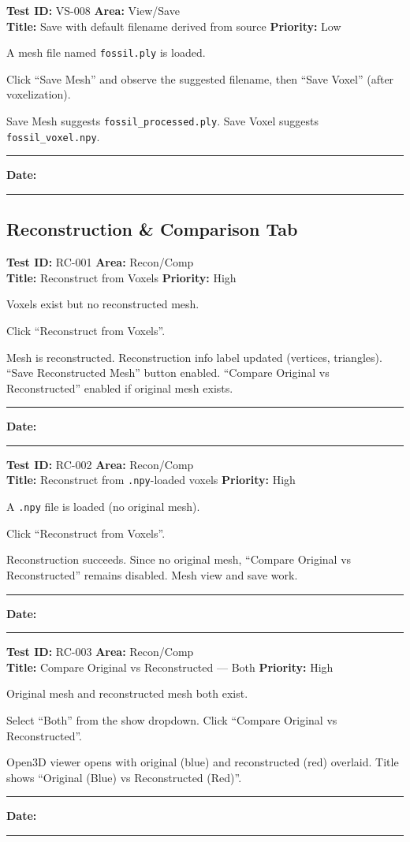 \documentclass[12pt,a4paper]{article}
\newenvironment{testcase}[4]{%
  \smallskip
  \noindent\textbf{Test ID:} #1 \hfill \textbf{Area:} #2 \\
  \textbf{Title:} #3 \hfill \textbf{Priority:} #4
  \begin{description}[leftmargin=2em,style=nextline]
    \item[\textbf{Preconditions:}]
}{%
    \item[\textbf{Steps:}]
    \item[\textbf{Expected Result:}]
    \item[\textbf{Status:}] \rule{3cm}{0.4pt} \hspace{1em} \textbf{Date:} \rule{3cm}{0.4pt}
    \item[\textbf{Notes:}]
  \end{description}
  \smallskip
}
\begin{document}
\begin{testcase}{VS-008}{View/Save}{Save with default filename derived from source}{Low}
  \item A mesh file named \texttt{fossil.ply} is loaded.
  \item Click ``Save Mesh'' and observe the suggested filename, then ``Save Voxel'' (after voxelization).
  \item Save Mesh suggests \texttt{fossil\_processed.ply}. Save Voxel suggests \texttt{fossil\_voxel.npy}.
\end{testcase}

\subsection{Reconstruction \& Comparison Tab}

\begin{testcase}{RC-001}{Recon/Comp}{Reconstruct from Voxels}{High}
  \item Voxels exist but no reconstructed mesh.
  \item Click ``Reconstruct from Voxels''.
  \item Mesh is reconstructed. Reconstruction info label updated (vertices, triangles). ``Save Reconstructed Mesh'' button enabled. ``Compare Original vs Reconstructed'' enabled if original mesh exists.
\end{testcase}

\begin{testcase}{RC-002}{Recon/Comp}{Reconstruct from \texttt{.npy}-loaded voxels}{High}
  \item A \texttt{.npy} file is loaded (no original mesh).
  \item Click ``Reconstruct from Voxels''.
  \item Reconstruction succeeds. Since no original mesh, ``Compare Original vs Reconstructed'' remains disabled. Mesh view and save work.
\end{testcase}

\begin{testcase}{RC-003}{Recon/Comp}{Compare Original vs Reconstructed --- Both}{High}
  \item Original mesh and reconstructed mesh both exist.
  \item Select ``Both'' from the show dropdown. Click ``Compare Original vs Reconstructed''.
  \item Open3D viewer opens with original (blue) and reconstructed (red) overlaid. Title shows ``Original (Blue) vs Reconstructed (Red)''.
\end{testcase}
\end{document}
